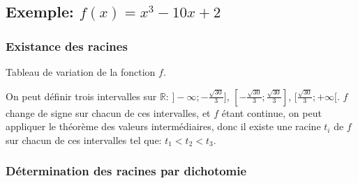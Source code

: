 \documentclass{article}
\begin{document}
	\subsection{Exemple: $f(x)=x^{3}-10x+2$}

	\subsubsection{Existance des racines}

	Tableau de variation de la fonction $f$.	

	\begin{center}
	\end{center}
	
	On peut définir trois intervalles sur $\mathbb{R}$: $]-\infty;-\frac{\sqrt{30}}{3}]$, $[-\frac{\sqrt{30}}{3};\frac{\sqrt{30}}{3}]$, $[\frac{\sqrt{30}}{3};+\infty[$. $f$ change de signe sur chacun de ces intervalles, et $f$ étant continue, on peut appliquer le théorème des valeurs intermédiaires, donc il existe une racine $t_{i}$ de $f$ sur chacun de ces intervalles tel que: $t_{1}<t_{2}<t_{3}$.
	
	\subsubsection{Détermination des racines par dichotomie}
	
\end{document}
